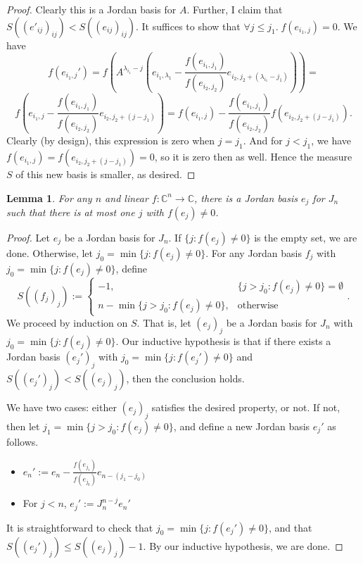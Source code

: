 \documentclass[12pt,psamsfonts]{article}
\newtheorem{lemma}[theorem]{Lemma}
\begin{document}
\begin{proof}
    Clearly this is a Jordan basis for \(A\).
    Further, I claim that \(S((e'_{ij})_{ij})  < S((e_{ij})_{ij})\).
    It suffices to show that \(\forall j \leq j_1. \; f (e_{i_1,j}) = 0\).
    We have 
    \[f (e_{i_1,j}') = f\left(A^{\lambda_{i_1} - j}\left(e_{i_1, \lambda_1} - \frac{f(e_{i_1, j_1})}{f(e_{i_2, j_2})}e_{i_2, j_2 + (\lambda_{i_1} - j_1)}\right)\right) =\]
    \[f\left(e_{i_1, j} - \frac{f(e_{i_1, j_1})}{f(e_{i_2, j_2})} e_{i_2, j_2 + (j - j_1)}\right) = f(e_{i_1, j}) - \frac{f(e_{i_1, j_1})}{f(e_{i_2, j_2})} f(e_{i_2, j_2 + (j - j_1)}).\]
    Clearly (by design), this expression is zero when \(j = j_1\).
    And for \(j < j_1\), we have \(f(e_{i_1, j}) = f(e_{i_2, j_2 + (j - j_1)}) = 0\), so it is zero then as well.
    Hence the measure \(S\) of this new basis is smaller, as desired.
\end{proof}

\begin{lemma}\label{normalization_helper_two}
    For any \(n\) and linear \(f : \mathbb{C}^n \to \mathbb{C}\), there is a Jordan basis \(e_j\) for \(J_n\) such that there is at most one \(j\) with \(f(e_j) \neq 0\).
\end{lemma}
\begin{proof}
    Let \(e_j\) be a Jordan basis for \(J_n\).
    If \(\{j : f(e_j) \neq 0\}\) is the empty set, we are done.
    Otherwise, let \(j_0 = \min\{j : f(e_j) \neq 0\}\).
    For any Jordan basis \(f_j\) with \(j_0 = \min\{j : f(e_j) \neq 0\}\), define 
    \[S((f_j)_j) := \begin{cases}
        -1, & \{j > j_0 : f(e_j) \neq 0\} = \emptyset \\
        n - \min\{j > j_0 : f(e_j) \neq 0\}, & \textrm{otherwise}
    \end{cases}.\]
    We proceed by induction on \(S\).
    That is, let \((e_j)_j\) be a Jordan basis for \(J_n\) with \(j_0 = \min\{j : f(e_j) \neq 0\}\).
    Our inductive hypothesis is that if there exists a Jordan basis \((e_j')_j\) with \(j_0 = \min\{j : f(e_j') \neq 0\}\) and \(S((e_j')_j) < S((e_j)_j)\), then the conclusion holds.
    \par We have two cases: either \((e_j)_j\) satisfies the desired property, or not.
    If not, then let \(j_1 = \min\{j > j_0 : f(e_j) \neq 0\}\), and define a new Jordan basis \(e_j'\) as follows.
    \begin{itemize}
        \item \(e_n' := e_n - \frac{f(e_{j_1})}{f(e_{j_0})} e_{n - (j_1 - j_0)}\)
        \item For \(j < n\), \(e_j' := J_n^{n - j} e_n'\)
    \end{itemize}
    It is straightforward to check that \(j_0 = \min\{j : f(e_j') \neq 0\}\), and that \(S((e_j')_j) \leq S((e_j)_j) - 1\).
    By our inductive hypothesis, we are done.
\end{proof}
\end{document}
